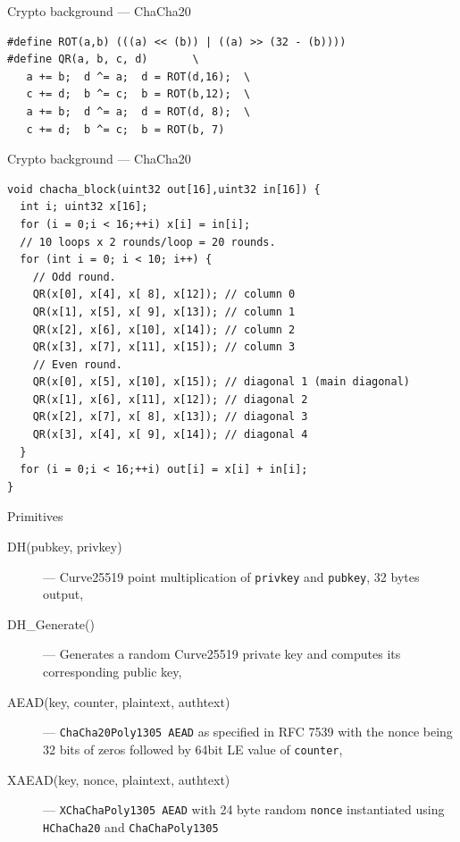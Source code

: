 \documentclass[xcolor=table]{beamer}
\begin{document}
    \begin{frame}[fragile]{Crypto background --- ChaCha20}
        \begin{verbatim}
#define ROT(a,b) (((a) << (b)) | ((a) >> (32 - (b))))
#define QR(a, b, c, d)       \
   a += b;  d ^= a;  d = ROT(d,16);  \
   c += d;  b ^= c;  b = ROT(b,12);  \
   a += b;  d ^= a;  d = ROT(d, 8);  \
   c += d;  b ^= c;  b = ROT(b, 7)
        \end{verbatim}
    \end{frame}

    \begin{frame}[fragile]{Crypto background --- ChaCha20}
        \begin{verbatim}
void chacha_block(uint32 out[16],uint32 in[16]) {
  int i; uint32 x[16];
  for (i = 0;i < 16;++i) x[i] = in[i];
  // 10 loops x 2 rounds/loop = 20 rounds.
  for (int i = 0; i < 10; i++) {
    // Odd round.
    QR(x[0], x[4], x[ 8], x[12]); // column 0
    QR(x[1], x[5], x[ 9], x[13]); // column 1
    QR(x[2], x[6], x[10], x[14]); // column 2
    QR(x[3], x[7], x[11], x[15]); // column 3
    // Even round.
    QR(x[0], x[5], x[10], x[15]); // diagonal 1 (main diagonal)
    QR(x[1], x[6], x[11], x[12]); // diagonal 2
    QR(x[2], x[7], x[ 8], x[13]); // diagonal 3
    QR(x[3], x[4], x[ 9], x[14]); // diagonal 4
  }
  for (i = 0;i < 16;++i) out[i] = x[i] + in[i];
}
        \end{verbatim}
    \end{frame}

    \begin{frame}{Primitives}
    \begin{description}
        \item[DH(pubkey, privkey)] --- Curve25519 point multiplication of \texttt{privkey} and \texttt{pubkey}, 32 bytes output,
        \item[DH\_Generate()] --- Generates a random Curve25519 private key and computes its corresponding public key,
        \item[AEAD(key, counter, plaintext, authtext)] --- \texttt{ChaCha20Poly1305 AEAD} as specified in RFC 7539 with the nonce being 32 bits of zeros followed by 64bit LE value of \texttt{counter},
        \item[XAEAD(key, nonce, plaintext, authtext)] --- \texttt{XChaChaPoly1305 AEAD} with 24 byte random \texttt{nonce} instantiated using \texttt{HChaCha20} and \texttt{ChaChaPoly1305}
    \end{description}
    \end{frame}
\end{document}
